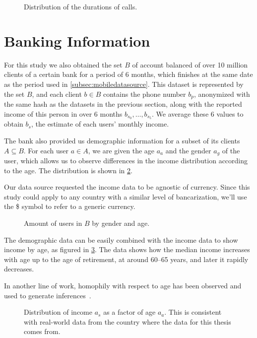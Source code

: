 \begin{figure}
\centering
{}
\caption{Distribution of the durations of calls.}
\label{fig:callduration}
\end{figure}

\section{Banking Information}
\label{subsec:bank_source}

For this study we also obtained the set $B$ of account balanced of over 10 million clients of a certain bank for a period of 6 months, which finishes at the same date as the period used in \cref{subsec:mobiledatasource}. This dataset is represented by the set $B$, and each client $b \in B$ contains the phone number $b_p$, anonymized with the same hash as the datasets in the previous section, along with the reported income of this person in over 6 months $b_{s_0}, \ldots, b_{s_5}$. We average these 6 values to obtain $b_s$, the estimate of each users' monthly income.

The bank also provided us demographic information for a subset of its clients $A \subseteq B$. For each user $a \in A$, we are given the age $a_a$ and the gender $a_g$ of the user, which allows us to observe differences in the income distribution according to the age. The distribution is shown in \cref{fig:gender_age_bar}.

Our data source requested the income data to be agnostic of currency. Since this study could apply to any country with a similar level of bancarization, we'll use the \$ symbol to refer to a generic currency.

\begin{figure}
\centering
{}
\caption{Amount of users in $B$ by gender and age.}
\label{fig:gender_age_bar}
\end{figure}

The demographic data can be easily combined with the income data to show income by age, as figured in \cref{fig:income_age_boxplot}. The data shows how the median income increases with age up to the age of retirement, at around 60--65 years, and later it rapidly decreases.

In another line of work, homophily with respect to age has been observed and used to generate inferences~\cite{brea2014}.

\begin{figure}
\centering
{}
\caption{Distribution of income $a_s$ as a factor of age $a_a$. This is consistent with real-world data from the country where the data for this thesis comes from.}
\label{fig:income_age_boxplot}
\end{figure}

